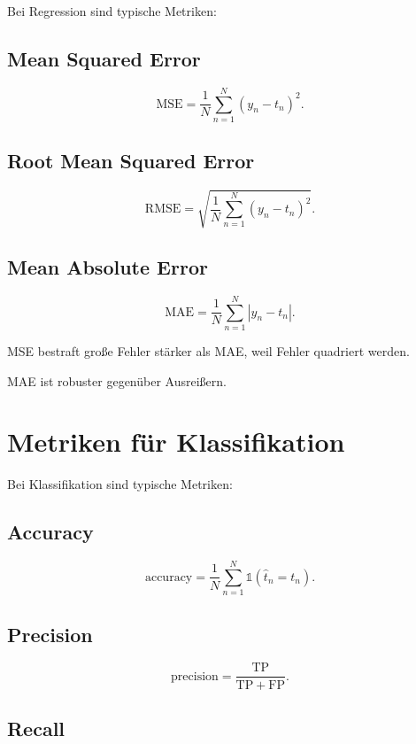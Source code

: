 Bei Regression sind typische Metriken:

\subsection{Mean Squared Error}

\[
    \mathrm{MSE}
    =
    \frac{1}{N}
    \sum_{n=1}^{N}
    (y_n-t_n)^2.
\]

\subsection{Root Mean Squared Error}

\[
    \mathrm{RMSE}
    =
    \sqrt{
        \frac{1}{N}
        \sum_{n=1}^{N}
        (y_n-t_n)^2
    }.
\]

\subsection{Mean Absolute Error}

\[
    \mathrm{MAE}
    =
    \frac{1}{N}
    \sum_{n=1}^{N}
    |y_n-t_n|.
\]

\begin{conceptbox}
MSE bestraft große Fehler stärker als MAE, weil Fehler quadriert werden.

MAE ist robuster gegenüber Ausreißern.
\end{conceptbox}

\section{Metriken für Klassifikation}

Bei Klassifikation sind typische Metriken:

\subsection{Accuracy}

\[
    \mathrm{accuracy}
    =
    \frac{1}{N}
    \sum_{n=1}^{N}
    \mathbb{1}(\hat{t}_n=t_n).
\]

\subsection{Precision}

\[
    \mathrm{precision}
    =
    \frac{\mathrm{TP}}{\mathrm{TP}+\mathrm{FP}}.
\]

\subsection{Recall}

